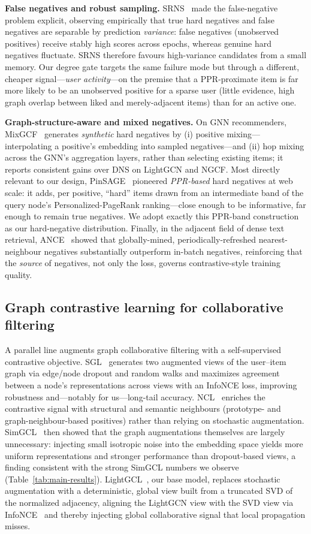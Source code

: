 \documentclass{article}
\begin{document}
\textbf{False negatives and robust sampling.} SRNS~\cite{srns} made the
false-negative problem explicit, observing empirically that true hard negatives
and false negatives are separable by prediction \emph{variance}: false negatives
(unobserved positives) receive stably high scores across epochs, whereas genuine
hard negatives fluctuate. SRNS therefore favours high-variance candidates from a
small memory. Our degree gate targets the same failure mode but through a
different, cheaper signal---\emph{user activity}---on the premise that a
PPR-proximate item is far more likely to be an unobserved positive for a sparse
user (little evidence, high graph overlap between liked and merely-adjacent items)
than for an active one.

\textbf{Graph-structure-aware and mixed negatives.} On GNN recommenders,
MixGCF~\cite{mixgcf} generates \emph{synthetic} hard negatives by (i) positive
mixing---interpolating a positive's embedding into sampled negatives---and (ii)
hop mixing across the GNN's aggregation layers, rather than selecting existing
items; it reports consistent gains over DNS on LightGCN and NGCF. Most directly
relevant to our design, PinSAGE~\cite{pinsage} pioneered \emph{PPR-based} hard
negatives at web scale: it adds, per positive, ``hard'' items drawn from an
intermediate band of the query node's Personalized-PageRank ranking---close enough
to be informative, far enough to remain true negatives. We adopt exactly this
PPR-band construction as our hard-negative distribution. Finally, in the adjacent
field of dense text retrieval, ANCE~\cite{ance} showed that globally-mined,
periodically-refreshed nearest-neighbour negatives substantially outperform
in-batch negatives, reinforcing that the \emph{source} of negatives, not only the
loss, governs contrastive-style training quality.

\subsection{Graph contrastive learning for collaborative filtering}
A parallel line augments graph collaborative filtering with a self-supervised
contrastive objective. SGL~\cite{sgl} generates two augmented views of the
user--item graph via edge/node dropout and random walks and maximizes agreement
between a node's representations across views with an InfoNCE loss, improving
robustness and---notably for us---long-tail accuracy. NCL~\cite{ncl} enriches the
contrastive signal with structural and semantic neighbours (prototype- and
graph-neighbour-based positives) rather than relying on stochastic augmentation.
SimGCL~\cite{simgcl} then showed that the graph augmentations themselves are
largely unnecessary: injecting small isotropic noise into the embedding space
yields more uniform representations and stronger performance than dropout-based
views, a finding consistent with the strong SimGCL numbers we observe
(Table~\ref{tab:main-results}). LightGCL~\cite{lightgcl}, our base model, replaces
stochastic augmentation with a deterministic, global view built from a truncated
SVD of the normalized adjacency, aligning the LightGCN view with the SVD view via
InfoNCE~\cite{infonce} and thereby injecting global collaborative signal that local
propagation misses.
\end{document}
